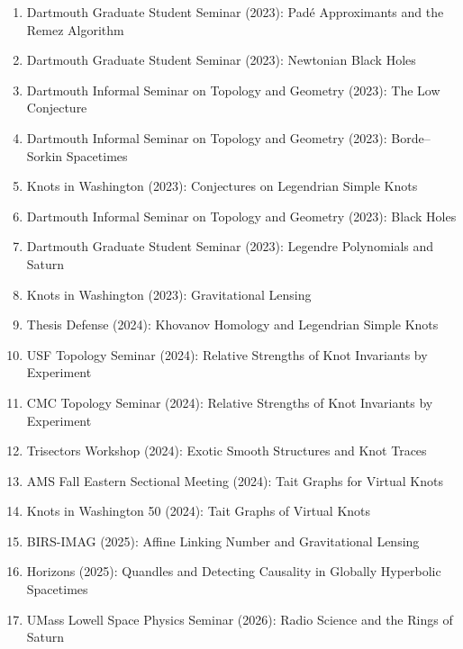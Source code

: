 \documentclass[letterpaper,sans]{moderncv}
\begin{document}
\begin{enumerate}
                Einstein Equations (Part 2)
            \item
                Dartmouth Graduate Student Seminar (2023):
                Pad\'{e} Approximants and the Remez Algorithm
            \item
                Dartmouth Graduate Student Seminar (2023):
                Newtonian Black Holes
            \item
                Dartmouth Informal Seminar on Topology and Geometry (2023):
                The Low Conjecture
            \item
                Dartmouth Informal Seminar on Topology and Geometry (2023):
                Borde--Sorkin Spacetimes
            \item
                Knots in Washington (2023):
                Conjectures on Legendrian Simple Knots
            \item
                Dartmouth Informal Seminar on Topology and Geometry (2023):
                Black Holes
            \item
                Dartmouth Graduate Student Seminar (2023):
                Legendre Polynomials and Saturn
            \item
                Knots in Washington (2023):
                Gravitational Lensing
            \item
                Thesis Defense (2024):
                Khovanov Homology and Legendrian Simple Knots
            \item
                USF Topology Seminar (2024):
                Relative Strengths of Knot Invariants by Experiment
            \item
                CMC Topology Seminar (2024):
                Relative Strengths of Knot Invariants by Experiment
            \item
                Trisectors Workshop (2024):
                Exotic Smooth Structures and Knot Traces
            \item
                AMS Fall Eastern Sectional Meeting (2024):
                Tait Graphs for Virtual Knots
            \item
                Knots in Washington 50 (2024):
                Tait Graphs of Virtual Knots
            \item
                BIRS-IMAG (2025):
                Affine Linking Number and Gravitational Lensing
            \item
                Horizons (2025):
                Quandles and Detecting Causality
                in Globally Hyperbolic Spacetimes
            \item
                UMass Lowell Space Physics Seminar (2026):
                Radio Science and the Rings of Saturn
        \end{enumerate}
\end{document}
